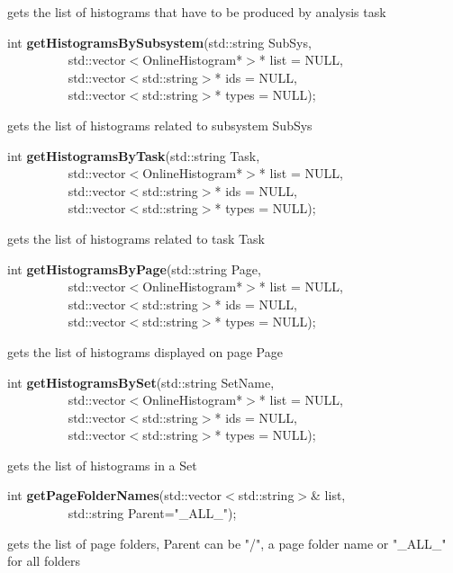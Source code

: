  gets the list of histograms that have to be produced by analysis task


\item    int {\bf getHistogramsBySubsystem}(std::string SubSys,\\\mbox{}~~~~~~~~~
			       std::vector$<$OnlineHistogram*$>$* list = NULL,\\\mbox{}~~~~~~~~~
			       std::vector$<$std::string$>$* ids = NULL,\\\mbox{}~~~~~~~~~
			       std::vector$<$std::string$>$* types = NULL);

 gets the list of histograms related to subsystem SubSys


\item    int {\bf getHistogramsByTask}(std::string Task,\\\mbox{}~~~~~~~~~
			  std::vector$<$OnlineHistogram*$>$* list = NULL,\\\mbox{}~~~~~~~~~
			  std::vector$<$std::string$>$* ids = NULL,\\\mbox{}~~~~~~~~~
			  std::vector$<$std::string$>$* types = NULL);

 gets the list of histograms related to task Task


\item    int {\bf getHistogramsByPage}(std::string Page,\\\mbox{}~~~~~~~~~
			  std::vector$<$OnlineHistogram*$>$* list = NULL,\\\mbox{}~~~~~~~~~
			  std::vector$<$std::string$>$* ids = NULL,\\\mbox{}~~~~~~~~~
			  std::vector$<$std::string$>$* types = NULL);

 gets the list of histograms displayed on page Page


\item    int {\bf getHistogramsBySet}(std::string SetName,\\\mbox{}~~~~~~~~~
			 std::vector$<$OnlineHistogram*$>$* list = NULL,\\\mbox{}~~~~~~~~~
			 std::vector$<$std::string$>$* ids = NULL,\\\mbox{}~~~~~~~~~
			 std::vector$<$std::string$>$* types = NULL);

 gets the list of histograms in a Set


\item    int {\bf getPageFolderNames}(std::vector$<$std::string$>$\& list,\\\mbox{}~~~~~~~~~ std::string Parent="\_ALL\_");


 gets the list of page folders, Parent can be "/", a page folder name or "\_ALL\_" for all folders  


